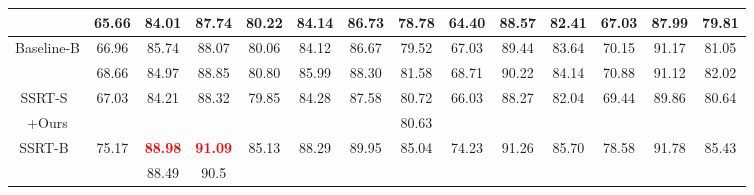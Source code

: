 \documentclass[journal]{IEEEtran}
\begin{document}
\begin{table*}[htp]
{\begin{tabular}{cccccccccccccc}
\rowcolor[gray]{0.9}\multicolumn{1}{c}{+Ours} & \multicolumn{1}{c}{65.66} & \multicolumn{1}{c}{84.01}                  & \multicolumn{1}{c}{87.74} & \multicolumn{1}{c}{80.22}                  & \multicolumn{1}{c}{84.14}                  & \multicolumn{1}{c}{86.73}                  & \multicolumn{1}{c}{78.78} & \multicolumn{1}{c}{64.40}                  & \multicolumn{1}{c}{88.57}                  & \multicolumn{1}{c}{82.41}                  & \multicolumn{1}{c}{67.03}                 & \multicolumn{1}{c}{87.99}                  & \multicolumn{1}{c}{79.81}                  \\ \hline
Baseline-B                          & \multicolumn{1}{c}{66.96} & \multicolumn{1}{c}{85.74}                  & \multicolumn{1}{c}{88.07} & \multicolumn{1}{c}{80.06}                  & \multicolumn{1}{c}{84.12}                  & \multicolumn{1}{c}{86.67}                  & \multicolumn{1}{c}{79.52} & \multicolumn{1}{c}{67.03}                  & \multicolumn{1}{c}{89.44}                  & \multicolumn{1}{c}{83.64}                  & \multicolumn{1}{c}{70.15}                 & \multicolumn{1}{c}{91.17}                  & \multicolumn{1}{c}{81.05}                  \\


\rowcolor[gray]{0.9} \multicolumn{1}{c}{+Ours} & \multicolumn{1}{c}{68.66} & \multicolumn{1}{c}{84.97}                  & \multicolumn{1}{c}{88.85} & \multicolumn{1}{c}{80.80}                  & \multicolumn{1}{c}{85.99}                  & \multicolumn{1}{c}{88.30}                  & \multicolumn{1}{c}{81.58} & \multicolumn{1}{c}{68.71}                  & \multicolumn{1}{c}{90.22}                  & \multicolumn{1}{c}{84.14}                  & \multicolumn{1}{c}{70.88}                 & \multicolumn{1}{c}{91.12}                  & \multicolumn{1}{c}{82.02}                  \\ \hline
SSRT-S~\cite{sun2022safeSSRT} & 67.03 & 84.21 & 88.32 & 79.85 & 84.28 & 87.58 & 80.72 & 66.03 & 88.27 & 82.04 & 69.44 & 89.86 & 80.64 \\
\rowcolor[gray]{0.9}+Ours &  &  &  &  &  &  & 80.63 &  &  &  &  &  &  \\ \hline
SSRT-B~\cite{sun2022safeSSRT}  & 75.17 & \textcolor{red}{\textbf{88.98}} & \textcolor{red}{\textbf{91.09}} & 85.13 & 88.29 & 89.95 & 85.04 & 74.23 & 91.26 & 85.70 & 78.58 & 91.78 & 85.43 \\
\rowcolor[gray]{0.9} \multicolumn{1}{c}{+Ours}  &  & 88.49 & 90.5 &  &  &  &  &  &  &   &  &   & \\  \hline
\end{tabular}}
\label{tab:office-home}
\end{table*}
\end{document}
